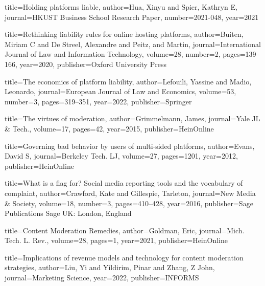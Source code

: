 {
  title={Holding platforms liable},
  author={Hua, Xinyu and Spier, Kathryn E},
  journal={HKUST Business School Research Paper},
  number={2021-048},
  year={2021}
}

{
  title={Rethinking liability rules for online hosting platforms},
  author={Buiten, Miriam C and De Streel, Alexandre and Peitz, and Martin},
  journal={International Journal of Law and Information Technology},
  volume={28},
  number={2},
  pages={139--166},
  year={2020},
  publisher={Oxford University Press}
}

{
  title={The economics of platform liability},
  author={Lefouili, Yassine and Madio, Leonardo},
  journal={European Journal of Law and Economics},
  volume={53},
  number={3},
  pages={319--351},
  year={2022},
  publisher={Springer}
}




{
  title={The virtues of moderation},
  author={Grimmelmann, James},
  journal={Yale JL \& Tech.},
  volume={17},
  pages={42},
  year={2015},
  publisher={HeinOnline}
}


{
  title={Governing bad behavior by users of multi-sided platforms},
  author={Evans, David S},
  journal={Berkeley Tech. LJ},
  volume={27},
  pages={1201},
  year={2012},
  publisher={HeinOnline}
}

{
  title={What is a flag for? Social media reporting tools and the vocabulary of complaint},
  author={Crawford, Kate and Gillespie, Tarleton},
  journal={New Media \& Society},
  volume={18},
  number={3},
  pages={410--428},
  year={2016},
  publisher={Sage Publications Sage UK: London, England}
}

{
  title={Content Moderation Remedies},
  author={Goldman, Eric},
  journal={Mich. Tech. L. Rev.},
  volume={28},
  pages={1},
  year={2021},
  publisher={HeinOnline}
}


{
  title={Implications of revenue models and technology for content moderation strategies},
  author={Liu, Yi and Yildirim, Pinar and Zhang, Z John},
  journal={Marketing Science},
  year={2022},
  publisher={INFORMS}
}

